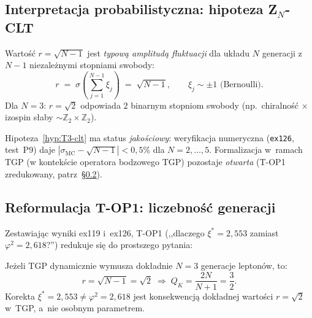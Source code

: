 \subsection{Interpretacja probabilistyczna: hipoteza Z$_N$-CLT}
\label{app:T3-clt}

\begin{hypothesis}\label{hyp:T3-clt}
Warto\'s\'c $r = \sqrt{N-1}$ jest \emph{typow\k{a} amplitud\k{a}
fluktuacji} dla uk\l{}adu $N$ genera\-cji z~$N-1$ niezale\.znymi
stopniami swobody:
\[
  r \;=\; \sigma\!\left(\sum_{j=1}^{N-1} \xi_j\right)
       \;=\; \sqrt{N-1},
  \qquad \xi_j \sim \pm 1 \text{ (Bernoulli)}.
\]
Dla $N = 3$: $r = \sqrt{2}$ odpowiada $2$ binarnym stopniom swobody
(np.\ chiralno\'s\'c $\times$ izospin słaby $\sim \mathbb{Z}_2 \times \mathbb{Z}_2$).
\end{hypothesis}

\begin{remark}
Hipoteza~\ref{hyp:T3-clt} ma status \emph{jako\'sciowy}:
weryfikacja numeryczna (\texttt{ex126}, test~P9) daje
$|\sigma_{\mathrm{MC}} - \sqrt{N-1}| < 0{,}5\%$ dla $N = 2, \ldots, 5$.
Formalizacja w~ramach TGP (w kontekście operatora bodzowego TGP)
pozostaje \emph{otwarta} (T-OP1 zredukowany, patrz~\S\ref{app:T3-top1}).
\end{remark}

\subsection{Reformulacja T-OP1: liczebno\'s\'c genera\-cji}
\label{app:T3-top1}

Zestawiaj\k{a}c wyniki ex119 i~ex126, T-OP1
(,,dlaczego $\xi^* = 2{,}553$ zamiast $\varphi^2 = 2{,}618$?'')
redukuje si\k{e} do prostszego pytania:

\begin{theorem}[Redukcja T-OP1]\label{thm:T3-top1-reduction}
Je\.zeli TGP dynamicznie wymusza dok\l{}adnie $N = 3$ genera\-cje
leptonów, to:
\begin{equation}\label{eq:T3-top1}
  r = \sqrt{N-1} = \sqrt{2}
  \;\Longrightarrow\;
  Q_K = \frac{2N}{N+1} = \frac{3}{2}.
\end{equation}
Korekta $\xi^* = 2{,}553 \neq \varphi^2 = 2{,}618$ jest konsekwencj\k{a}
dok\l{}adnej warto\'sci $r = \sqrt{2}$ w~TGP,
a~nie osobnym parametrem.
\end{theorem}

